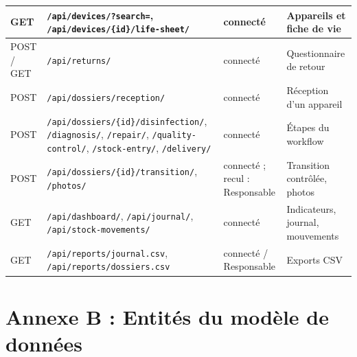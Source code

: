 {\begin{longtable}{|>{\raggedright\arraybackslash}p{1.91cm}|>{\raggedright\arraybackslash}p{5.72cm}|>{\raggedright\arraybackslash}p{2.77cm}|>{\raggedright\arraybackslash}p{3.47cm}|}
\rowcolor{ALgris} GET & \texttt{/\allowbreak{}api/\allowbreak{}devices/\allowbreak{}?search=}, \texttt{/\allowbreak{}api/\allowbreak{}devices/\allowbreak{}\{id\}/\allowbreak{}life-\allowbreak{}sheet/\allowbreak{}} & connecté & Appareils et fiche de vie \\ \hline
POST / GET & \texttt{/\allowbreak{}api/\allowbreak{}returns/\allowbreak{}} & connecté & Questionnaire de retour \\ \hline
\rowcolor{ALgris} POST & \texttt{/\allowbreak{}api/\allowbreak{}dossiers/\allowbreak{}reception/\allowbreak{}} & connecté & Réception d'un appareil \\ \hline
POST & \texttt{/\allowbreak{}api/\allowbreak{}dossiers/\allowbreak{}\{id\}/\allowbreak{}disinfection/\allowbreak{}}, \texttt{/\allowbreak{}diagnosis/\allowbreak{}}, \texttt{/\allowbreak{}repair/\allowbreak{}}, \texttt{/\allowbreak{}quality-\allowbreak{}control/\allowbreak{}}, \texttt{/\allowbreak{}stock-\allowbreak{}entry/\allowbreak{}}, \texttt{/\allowbreak{}delivery/\allowbreak{}} & connecté & Étapes du workflow \\ \hline
\rowcolor{ALgris} POST & \texttt{/\allowbreak{}api/\allowbreak{}dossiers/\allowbreak{}\{id\}/\allowbreak{}transition/\allowbreak{}}, \texttt{/\allowbreak{}photos/\allowbreak{}} & connecté ; recul : Responsable & Transition contrôlée, photos \\ \hline
GET & \texttt{/\allowbreak{}api/\allowbreak{}dashboard/\allowbreak{}}, \texttt{/\allowbreak{}api/\allowbreak{}journal/\allowbreak{}}, \texttt{/\allowbreak{}api/\allowbreak{}stock-\allowbreak{}movements/\allowbreak{}} & connecté & Indicateurs, journal, mouvements \\ \hline
\rowcolor{ALgris} GET & \texttt{/\allowbreak{}api/\allowbreak{}reports/\allowbreak{}journal.\allowbreak{}csv}, \texttt{/\allowbreak{}api/\allowbreak{}reports/\allowbreak{}dossiers.\allowbreak{}csv} & connecté / Responsable & Exports CSV \\ \hline
\end{longtable}
}

\section*{Annexe B : Entités du modèle de données}


